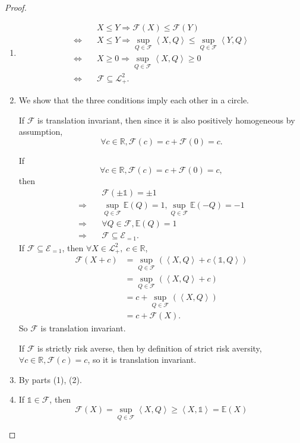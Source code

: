 \begin{proof}
\begin{enumerate}[(1)]
	\item
	$$
	\begin{aligned}
	 & X\le Y \Rightarrow \mathcal{F}(X)\le \mathcal{F}(Y)   \\
	 \Leftrightarrow \quad & X\le Y \Rightarrow \sup_{Q\in \mathscr{F}}\left< X, Q \right> \le \sup_{Q\in \mathscr{F}}\left< Y, Q \right>  \\
	 \Leftrightarrow \quad & X\ge 0 \Rightarrow \sup_{Q\in \mathscr{F}}\left< X, Q \right> \ge 0\\
	 \Leftrightarrow \quad & \mathscr{F}\subseteq \mathscr{L}^2_+.
	\end{aligned}
	$$
	\item We show that the three conditions imply each other in a circle. 
	
	If $\mathcal{F}$ is translation invariant, then since it is also positively homogeneous by assumption, 
	$$\forall c\in\mathbb{R}, \mathcal{F}(c) = c + \mathcal{F}(0) = c.$$
	
	If 
	$$\forall c\in\mathbb{R}, \mathcal{F}(c) = c + \mathcal{F}(0) = c,$$
	then 
	$$
	\begin{aligned}
	& \mathcal{F}(\pm \mathds{1}) = \pm 1 \\
	\Rightarrow \quad & \sup_{Q\in \mathscr{F}}\mathbb{E}(Q) = 1, \sup_{Q\in \mathscr{F}}\mathbb{E}(-Q) = -1  \\
	\Rightarrow \quad & \forall Q \in\mathscr{F}, \mathbb{E}(Q) = 1  \\
	\Rightarrow \quad & \mathscr{F}\subseteq \mathscr{E}_{=1}.
	\end{aligned}
	$$
	If $\mathscr{F}\subseteq \mathscr{E}_{=1} $, then  $\forall X\in  \mathscr{L}^2_+,\; c\in\mathbb{R}$, 
	$$
	\begin{aligned}
	\mathcal{F}(X+c) 
	&= \sup_{Q\in \mathscr{F}}(\left< X, Q \right> + c \left< \mathds{1}, Q \right>) \\
	&= \sup_{Q\in \mathscr{F}}(\left< X, Q \right> + c) \\
	&= c + \sup_{Q\in \mathscr{F}}(\left< X, Q \right>) \\
	&= c + \mathcal{F}(X).
	\end{aligned}
	$$
	So $\mathcal{F}$ is translation invariant.
	
	If $\mathcal{F}$ is strictly risk averse, then by definition of strict risk aversity, $\forall c\in \mathbb{R}, \mathcal{F}(c) = c$, so it is translation invariant.
	\item By parts (1), (2).
	\item If $\mathds{1}\in \mathscr{F}$, then 
	$$\mathcal{F}(X) = \sup_{Q\in \mathscr{F}}\left< X, Q \right> \ge \left< X, \mathds{1} \right> = \mathbb{E}(X)$$
	

\end{enumerate}
\end{proof}
